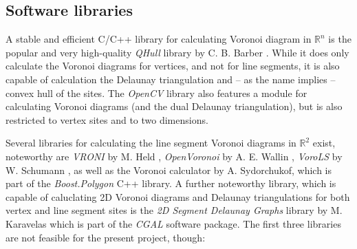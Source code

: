 \subsection{Software libraries}
A stable and efficient C/C++ library for calculating Voronoi diagram in $\mathbb{R}^n$ is the popular and very 
high-quality \textit{QHull} library by C. B. Barber \cite{web_qhull}. While it does only calculate 
the Voronoi diagrams for vertices, and not for line segments, it is also capable of calculation the Delaunay
triangulation and -- as the name implies -- convex hull of the sites.
The \textit{OpenCV} library \cite{web_opencv} also features a module for calculating Voronoi diagrams
(and the dual Delaunay triangulation), but is also restricted to vertex sites and to two dimensions.

Several libraries for calculating the line segment Voronoi diagrams in $\mathbb{R}^2$ exist, noteworthy 
are \textit{VRONI} by M. Held \cite{Held2001}, \textit{OpenVoronoi} by A. E. Wallin \cite{web_openvoronoi}, \textit{VoroLS} 
by W. Schumann \cite{DiplomaSchumann}, as well as the Voronoi calculator \cite{web_boost_polygon_voronoi} 
by A. Sydorchukof, which is part of the \textit{Boost.Polygon}  \cite{web_boost_polygon, Simonson2009} 
C++ library.
A further noteworthy library, which is capable of caluclating 2D Voronoi diagrams and Delaunay triangulations
for both vertex and line segment sites is the \textit{2D Segment Delaunay Graphs} library by M. Karavelas \cite{web_2dsegdel} 
which is part of the \textit{CGAL} \cite{web_cgal} software package.
The first three libraries are not feasible for the present project, though: 
